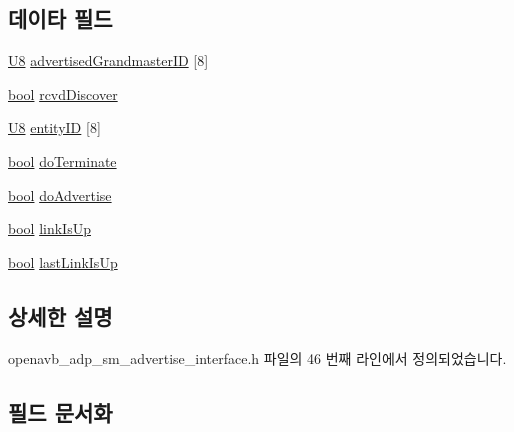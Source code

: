 \subsection*{데이타 필드}
\begin{DoxyCompactItemize}
\item 
\hyperlink{openavb__types__base__pub_8h_aa63ef7b996d5487ce35a5a66601f3e73}{U8} \hyperlink{structopenavb__adp__sm__advertise__interface__vars__t_a408b05bc02e7222228de5dcce0351eb0}{advertised\+Grandmaster\+ID} \mbox{[}8\mbox{]}
\item 
\hyperlink{avb__gptp_8h_af6a258d8f3ee5206d682d799316314b1}{bool} \hyperlink{structopenavb__adp__sm__advertise__interface__vars__t_a6bc6c2f6edf5d66acea29a374c0a7a9d}{rcvd\+Discover}
\item 
\hyperlink{openavb__types__base__pub_8h_aa63ef7b996d5487ce35a5a66601f3e73}{U8} \hyperlink{structopenavb__adp__sm__advertise__interface__vars__t_ac77671b58546f06d8afda2a90d9dd311}{entity\+ID} \mbox{[}8\mbox{]}
\item 
\hyperlink{avb__gptp_8h_af6a258d8f3ee5206d682d799316314b1}{bool} \hyperlink{structopenavb__adp__sm__advertise__interface__vars__t_a5fc548cdb095393450f28eab966a626f}{do\+Terminate}
\item 
\hyperlink{avb__gptp_8h_af6a258d8f3ee5206d682d799316314b1}{bool} \hyperlink{structopenavb__adp__sm__advertise__interface__vars__t_acd476f63fef77a199ec9cb8ff44f8a57}{do\+Advertise}
\item 
\hyperlink{avb__gptp_8h_af6a258d8f3ee5206d682d799316314b1}{bool} \hyperlink{structopenavb__adp__sm__advertise__interface__vars__t_a9e30d2dbd93f538fc2b6d6281735b2f0}{link\+Is\+Up}
\item 
\hyperlink{avb__gptp_8h_af6a258d8f3ee5206d682d799316314b1}{bool} \hyperlink{structopenavb__adp__sm__advertise__interface__vars__t_a7714c2bfb039e48f1541375d03dbb6b6}{last\+Link\+Is\+Up}
\end{DoxyCompactItemize}


\subsection{상세한 설명}


openavb\+\_\+adp\+\_\+sm\+\_\+advertise\+\_\+interface.\+h 파일의 46 번째 라인에서 정의되었습니다.



\subsection{필드 문서화}
